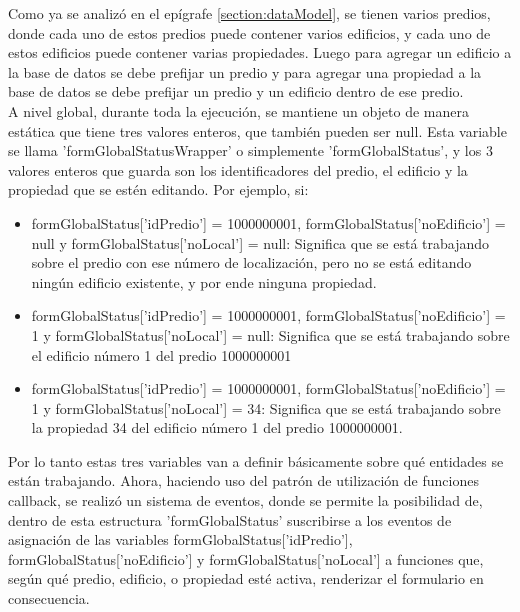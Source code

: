 Como ya se analizó en el epígrafe \ref{section:dataModel}, se tienen varios predios, donde cada uno de estos predios puede contener varios
edificios, y cada uno de estos edificios puede contener varias propiedades. Luego para agregar un edificio a la base de datos se debe prefijar un predio
y para agregar una propiedad a la base de datos se debe prefijar un predio y un edificio dentro de ese predio.\\
A nivel global, durante toda la ejecución, se mantiene un objeto de manera estática que tiene tres valores enteros, que también pueden ser null.
Esta variable se llama 'formGlobalStatusWrapper' o simplemente 'formGlobalStatus', y los 3 valores enteros que guarda son los identificadores del predio,
el edificio y la propiedad que se estén editando. Por ejemplo, si:
\begin{itemize}
    \item formGlobalStatus['idPredio'] = 1000000001, formGlobalStatus['noEdificio'] = null y formGlobalStatus['noLocal'] = null: Significa que se está trabajando sobre el
          predio con ese número de localización, pero no se está editando ningún edificio existente, y por ende ninguna propiedad.
    \item formGlobalStatus['idPredio'] = 1000000001, formGlobalStatus['noEdificio'] = 1 y formGlobalStatus['noLocal'] = null: Significa que se está trabajando sobre el edificio
          número 1 del predio 1000000001
    \item formGlobalStatus['idPredio'] = 1000000001, formGlobalStatus['noEdificio'] = 1 y formGlobalStatus['noLocal'] = 34: Significa que se está trabajando sobre la propiedad 34 del edificio
          número 1 del predio 1000000001.
\end{itemize}
Por lo tanto estas tres variables van a definir básicamente sobre qué entidades se están trabajando. Ahora, haciendo uso del patrón de utilización de funciones callback, se realizó un sistema de
eventos, donde se permite la posibilidad de, dentro de esta estructura 'formGlobalStatus' suscribirse a los eventos de asignación de las variables formGlobalStatus['idPredio'], formGlobalStatus['noEdificio'] y formGlobalStatus['noLocal']
a funciones que, según qué predio, edificio, o propiedad esté activa, renderizar el formulario en consecuencia.
